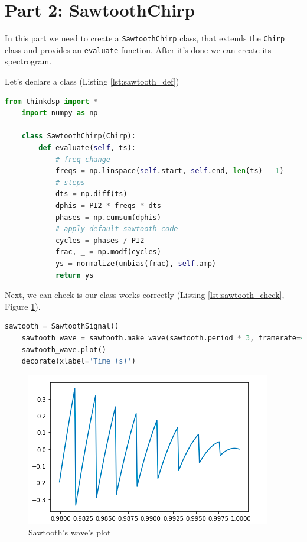 \documentclass[a4paper]{article}
\begin{document}
    \newpage
        \section{Part 2: SawtoothChirp}

        In this part we need to create a \texttt{SawtoothChirp} class, that extends the \texttt{Chirp} class and provides an \texttt{evaluate} function. After it's done we can create its spectrogram.
        
        Let's declare a class (Listing \ref{lst:sawtooth_def})
            
        \begin{lstlisting}[language=Python,caption={Sawtooth class definition},label={lst:sawtooth_def}]
    from thinkdsp import *
    import numpy as np
    
    class SawtoothChirp(Chirp):
        def evaluate(self, ts):
            # freq change
            freqs = np.linspace(self.start, self.end, len(ts) - 1)
            # steps
            dts = np.diff(ts)
            dphis = PI2 * freqs * dts
            phases = np.cumsum(dphis)
            # apply default sawtooth code
            cycles = phases / PI2
            frac, _ = np.modf(cycles)
            ys = normalize(unbias(frac), self.amp)
            return ys
        \end{lstlisting}
        
        
        
        Next, we can check is our class works correctly (Listing \ref{lst:sawtooth_check}, Figure \ref{fig:sawtooth_wave_plot}).
            
        \begin{lstlisting}[language=Python,caption=Sawtooth wave plot code,label={lst:sawtooth_check}]
    sawtooth = SawtoothSignal()
    sawtooth_wave = sawtooth.make_wave(sawtooth.period * 3, framerate=40000)
    sawtooth_wave.plot()
    decorate(xlabel='Time (s)')
        \end{lstlisting}

        \begin{figure}[H]
          \centering
          \includegraphics[width=\textwidth]{img/saw_c.png}
          \caption{Sawtooth's wave's plot}
          \label{fig:sawtooth_wave_plot}
        \end{figure}
            
\end{document}
